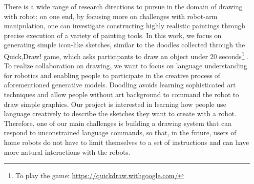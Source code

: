 There is a wide range of research directions to pursue in the domain of drawing with robot; on one end, by focusing more on challenges with robot-arm manipulation, one can investigate constructing highly realistic paintings through precise execution of a variety of painting tools. 
In this work, we focus on generating simple icon-like sketches, similar to the doodles collected through the Quick,Draw! game, which asks participants to draw an object under 20 seconds\footnote{To play the game: \url{https://quickdraw.withgoogle.com/}} \citep{ha2017neural}. 
To realize collaboration on drawing, we want to focus on language understanding for robotics and enabling people to participate in the creative process of aforementioned generative models. Doodling avoids learning sophisticated art techniques and allow people without art background to command the robot to draw simple graphics. Our project is interested in learning how people use language creatively to describe the sketches they want to create with a robot. 
Therefore, one of our main challenges is building a drawing system that can respond to unconstrained language commands, so that, in the future, users of home robots do not have to limit themselves to a set of instructions and can have more natural interactions with the robots.     



